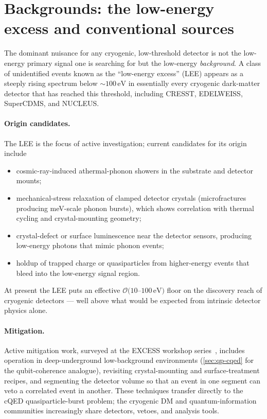 \section{Backgrounds: the low-energy excess and conventional sources}
\label{sec:qp-backgrounds}

\begin{phenomenon}
The dominant nuisance for any cryogenic, low-threshold detector
is not the low-energy primary signal one is searching for but the
low-energy \emph{background}.  A class of unidentified events
known as the ``low-energy excess'' (LEE) appears as a steeply
rising spectrum below $\sim 100\,\text{eV}$ in essentially every
cryogenic dark-matter detector that has reached this threshold,
including CRESST, EDELWEISS, SuperCDMS, and NUCLEUS.
\end{phenomenon}

\paragraph{Origin candidates.}
The LEE is the focus of active investigation; current candidates
for its origin~\cite{adari2022} include
\begin{itemize}
  \item cosmic-ray-induced athermal-phonon showers in the
        substrate and detector mounts;
  \item mechanical-stress relaxation of clamped detector
        crystals (microfractures producing meV-scale phonon
        bursts), which shows correlation with thermal cycling and
        crystal-mounting geometry;
  \item crystal-defect or surface luminescence near the detector
        sensors, producing low-energy photons that mimic phonon
        events;
  \item holdup of trapped charge or quasiparticles from
        higher-energy events that bleed into the low-energy
        signal region.
\end{itemize}
At present the LEE puts an effective $\mathcal O(10$--$100\,\text{eV})$
floor on the discovery reach of cryogenic detectors --- well
above what would be expected from intrinsic detector physics
alone.

\paragraph{Mitigation.}
Active mitigation work, surveyed at the EXCESS workshop
series~\cite{adari2022}, includes operation in deep-underground
low-background environments (\cref{sec:qp-cqed} for the
qubit-coherence analogue), revisiting crystal-mounting and
surface-treatment recipes, and segmenting the detector volume so
that an event in one segment can veto a correlated event in
another.  These techniques transfer directly to the cQED
quasiparticle-burst problem; the cryogenic DM and
quantum-information communities increasingly share detectors,
vetoes, and analysis tools.

